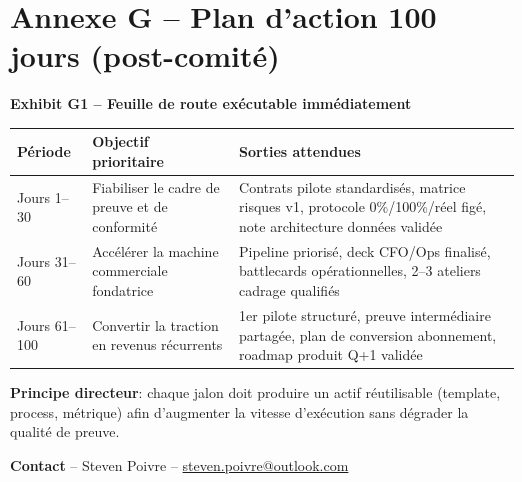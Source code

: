 \documentclass[11pt,a4paper]{article}
\newcommand{\exhibit}[1]{\vspace{2mm}\noindent\colorbox{PraedixaLight}{\parbox{\dimexpr\linewidth-2\fboxsep\relax}{\textbf{#1}}}\vspace{1mm}}
\begin{document}
\section{Annexe G -- Plan d'action 100 jours (post-comité)}
\exhibit{Exhibit G1 -- Feuille de route exécutable immédiatement}
\begin{tabularx}{\linewidth}{@{}l X X@{}}
\toprule
\textbf{Période} & \textbf{Objectif prioritaire} & \textbf{Sorties attendues} \\
\midrule
Jours 1--30 & Fiabiliser le cadre de preuve et de conformité & Contrats pilote standardisés, matrice risques v1, protocole 0\%/100\%/réel figé, note architecture données validée \\
Jours 31--60 & Accélérer la machine commerciale fondatrice & Pipeline priorisé, deck CFO/Ops finalisé, battlecards opérationnelles, 2--3 ateliers cadrage qualifiés \\
Jours 61--100 & Convertir la traction en revenus récurrents & 1er pilote structuré, preuve intermédiaire partagée, plan de conversion abonnement, roadmap produit Q+1 validée \\
\bottomrule
\end{tabularx}

\vspace{2mm}
\noindent\textbf{Principe directeur}: chaque jalon doit produire un actif réutilisable (template, process, métrique) afin d'augmenter la vitesse d'exécution sans dégrader la qualité de preuve.

\vspace{4mm}
\noindent\textbf{Contact} -- Steven Poivre -- \href{mailto:steven.poivre@outlook.com}{steven.poivre@outlook.com}
\end{document}
